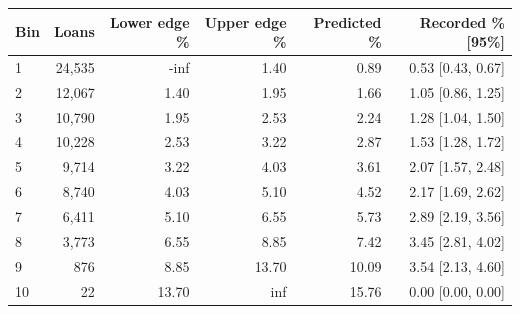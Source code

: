 \begingroup\small\setlength{\tabcolsep}{3pt}
\begin{tabularx}{\linewidth}{Xrrrrr}\toprule
Bin & Loans & Lower edge \% & Upper edge \% & Predicted \% & Recorded \% [95\%] \\ \midrule
1 & 24,535 & -inf & 1.40 & 0.89 & 0.53 [0.43, 0.67] \\
2 & 12,067 & 1.40 & 1.95 & 1.66 & 1.05 [0.86, 1.25] \\
3 & 10,790 & 1.95 & 2.53 & 2.24 & 1.28 [1.04, 1.50] \\
4 & 10,228 & 2.53 & 3.22 & 2.87 & 1.53 [1.28, 1.72] \\
5 & 9,714 & 3.22 & 4.03 & 3.61 & 2.07 [1.57, 2.48] \\
6 & 8,740 & 4.03 & 5.10 & 4.52 & 2.17 [1.69, 2.62] \\
7 & 6,411 & 5.10 & 6.55 & 5.73 & 2.89 [2.19, 3.56] \\
8 & 3,773 & 6.55 & 8.85 & 7.42 & 3.45 [2.81, 4.02] \\
9 & 876 & 8.85 & 13.70 & 10.09 & 3.54 [2.13, 4.60] \\
10 & 22 & 13.70 & inf & 15.76 & 0.00 [0.00, 0.00] \\
\bottomrule\end{tabularx}\endgroup
